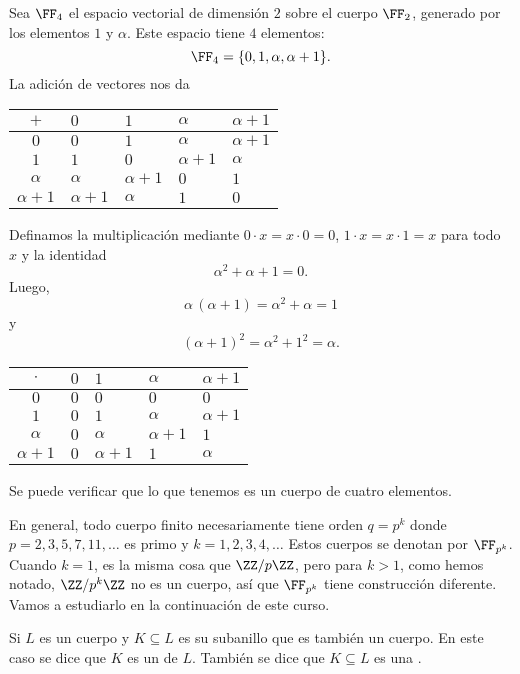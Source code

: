 \begin{ejemplo}
  Sea $\FF_4$ el espacio vectorial de dimensión $2$ sobre el cuerpo $\FF_2$,
  generado por los elementos $1$ y $\alpha$. Este espacio tiene $4$ elementos:
  $$\FF_4 = \{ 0, 1, \alpha, \alpha+1 \}.$$
  La adición de vectores nos da
  \begin{center}
    \begin{tabular}{c|f{1cm}f{1cm}f{1cm}f{1cm}}
      $+$ & $0$ & $1$ & $\alpha$ & $\alpha+1$ \tabularnewline
      \hline
      $0$ & $0$ & $1$ & $\alpha$ & $\alpha+1$ \tabularnewline
      $1$ & $1$ & $0$ & $\alpha+1$ & $\alpha$ \tabularnewline
      $\alpha$ & $\alpha$ & $\alpha+1$ & $0$ & $1$ \tabularnewline
      $\alpha+1$ & $\alpha+1$ & $\alpha$ & $1$ & $0$
    \end{tabular}
  \end{center}
  Definamos la multiplicación mediante $0\cdot x = x\cdot 0 = 0$,
  $1\cdot x = x\cdot 1 = x$ para todo $x$ y la identidad
  $$\alpha^2 + \alpha + 1 = 0.$$
  Luego,
  $$\alpha\,(\alpha+1) = \alpha^2 + \alpha = 1$$
  y
  $$(\alpha+1)^2 = \alpha^2 + 1^2 = \alpha.$$

  \begin{center}
    \begin{tabular}{c|f{1cm}f{1cm}f{1cm}f{1cm}}
      $\cdot$ & $0$ & $1$ & $\alpha$ & $\alpha+1$ \tabularnewline
      \hline
      $0$ & $0$ & $0$ & $0$ & $0$ \tabularnewline
      $1$ & $0$ & $1$ & $\alpha$ & $\alpha+1$ \tabularnewline
      $\alpha$ & $0$ & $\alpha$ & $\alpha+1$ & $1$ \tabularnewline
      $\alpha+1$ & $0$ & $\alpha+1$ & $1$ & $\alpha$
    \end{tabular}
  \end{center}
  Se puede verificar que lo que tenemos es un cuerpo de cuatro elementos.
\end{ejemplo}

\begin{digresion}
  En general, todo cuerpo finito necesariamente tiene orden $q = p^k$ donde
  $p = 2, 3, 5, 7, 11, \ldots$ es primo y $k = 1, 2, 3, 4, \ldots$ Estos cuerpos
  se denotan por $\FF_{p^k}$. Cuando $k = 1$, es la misma cosa que $\ZZ/p\ZZ$,
  pero para $k > 1$, como hemos notado, $\ZZ/p^k\ZZ$ no es un cuerpo, así que
  $\FF_{p^k}$ tiene construcción diferente. Vamos a estudiarlo en la
  continuación de este curso.
\end{digresion}

\begin{definicion}
  Si $L$ es un cuerpo y $K \subseteq L$ es su subanillo que es también un
  cuerpo. En este caso se dice que $K$ es un  de $L$. También se
  dice que $K \subseteq L$ es una .
\end{definicion}

